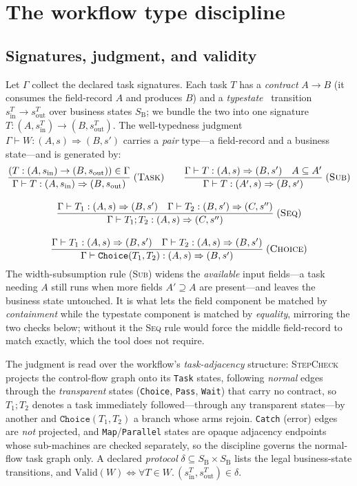 \documentclass[11pt]{article}
\newcommand{\tool}{\textsc{StepCheck}}
\theoremstyle{plain}
\theoremstyle{definition}
\theoremstyle{remark}
\begin{document}
\section{The workflow type discipline}
\label{sec:tr:types}

\subsection{Signatures, judgment, and validity}

Let $\Gamma$ collect the declared task signatures. Each task $T$ has a \emph{contract}
$A\rightarrow B$ (it consumes the field-record $A$ and produces $B$) and a
\emph{typestate}~\cite{stromYemini,delineFahndrich} transition
$s_{\mathrm{in}}^{T}\!\to\!s_{\mathrm{out}}^{T}$ over business states $S_{\mathrm B}$;
we bundle the two into one signature $T:(A,s_{\mathrm{in}}^T)\to(B,s_{\mathrm{out}}^T)$. The
well-typedness judgment $\Gamma\vdash W:(A,s)\Rightarrow(B,s')$ carries a \emph{pair} type---a
field-record and a business state---and is generated by:
\begin{gather*}
\frac{(T:(A,s_{\mathrm{in}})\to(B,s_{\mathrm{out}}))\in\Gamma}
     {\Gamma\vdash T:(A,s_{\mathrm{in}})\Rightarrow(B,s_{\mathrm{out}})}\;(\textsc{Task})
\qquad
\frac{\Gamma\vdash T:(A,s)\Rightarrow(B,s')\quad A\subseteq A'}
     {\Gamma\vdash T:(A',s)\Rightarrow(B,s')}\;(\textsc{Sub})
\\[2.2ex]
\frac{\Gamma\vdash T_1:(A,s)\Rightarrow(B,s')\quad\Gamma\vdash T_2:(B,s')\Rightarrow(C,s'')}
     {\Gamma\vdash T_1;T_2:(A,s)\Rightarrow(C,s'')}\;(\textsc{Seq})
\\[2.2ex]
\frac{\Gamma\vdash T_1:(A,s)\Rightarrow(B,s')\quad\Gamma\vdash T_2:(A,s)\Rightarrow(B,s')}
     {\Gamma\vdash \mathtt{Choice}(T_1,T_2):(A,s)\Rightarrow(B,s')}\;(\textsc{Choice})
\end{gather*}
The width-subsumption rule (\textsc{Sub}) widens the \emph{available} input fields---a task
needing $A$ still runs when more fields $A'\supseteq A$ are present---and leaves the business
state untouched. It is what lets the field component be matched by \emph{containment} while the
typestate component is matched by \emph{equality}, mirroring the two checks below; without it the
\textsc{Seq} rule would force the middle field-record to match exactly, which the tool does not
require.

The judgment is read over the workflow's \emph{task-adjacency} structure: \tool{} projects the
control-flow graph onto its \texttt{Task} states, following \emph{normal} edges through the
\emph{transparent} states (\texttt{Choice}, \texttt{Pass}, \texttt{Wait}) that carry no
contract, so $T_1;T_2$ denotes a task immediately followed---through any transparent
states---by another and $\mathtt{Choice}(T_1,T_2)$ a branch whose arms rejoin. \texttt{Catch}
(error) edges are \emph{not} projected, and \texttt{Map}/\texttt{Parallel} states are opaque
adjacency endpoints whose sub-machines are checked separately, so the discipline governs the
normal-flow task graph only. A declared \emph{protocol} $\delta\subseteq S_{\mathrm B}\times
S_{\mathrm B}$ lists the legal business-state transitions, and
$\mathrm{Valid}(W)\iff\forall T\in W.\,(s_{\mathrm{in}}^{T},s_{\mathrm{out}}^{T})\in\delta$.
\end{document}
